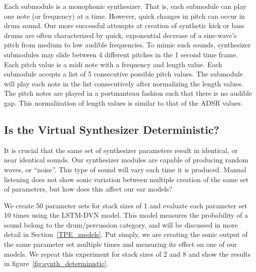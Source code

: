 \documentclass[\main/thesis.tex]{subfiles}
\begin{document}
Each submodule is a monophonic synthesizer. That is, each submodule can play one note (or frequency) at a time. However, quick changes in pitch can occur in drum sound. Our more successful attempts at creation of synthetic kick or bass drums are often characterized by quick, exponential decrease of a sine-wave's pitch from medium to low audible frequencies. To mimic such sounds, synthesizer submodules may slide between 4 different pitches in the 1 second time frame. Each pitch value is a midi note with a frequency and length value. Each submodule accepts a list of 5 consecutive possible pitch values. The submodule will play each note in the list consecutively after normalizing the length values. The pitch notes are played in a portmanteau fashion such that there is no audible gap. This normalization of length values is similar to that of the ADSR values. 



\subsection{Is the Virtual Synthesizer Deterministic?}
\label{chap3:synth_deterministic}
It is crucial that the same set of synthesizer parameters result in identical, or near identical sounds. Our synthesizer modules are capable of producing random waves, or \enquote{noise}. This type of sound will vary each time it is produced. Manual listening does not show sonic variation between multiple creation of the same set of parameters, but how does this affect our ear models?

We create 50 parameter sets for stack sizes of 1 and evaluate each parameter set 10 times using the LSTM-DVN model. This model measures the probability of a sound belong to the drum/percussion category, and will be discussed in more detail in Section~\ref{TPE_models}. Put simply, we are creating the sonic output of the same parameter set multiple times and measuring its effect on one of our models. We repeat this experiment for stack sizes of 2 and 8 and show the results in figure~\ref{fig:synth_deterministic}.
\end{document}
